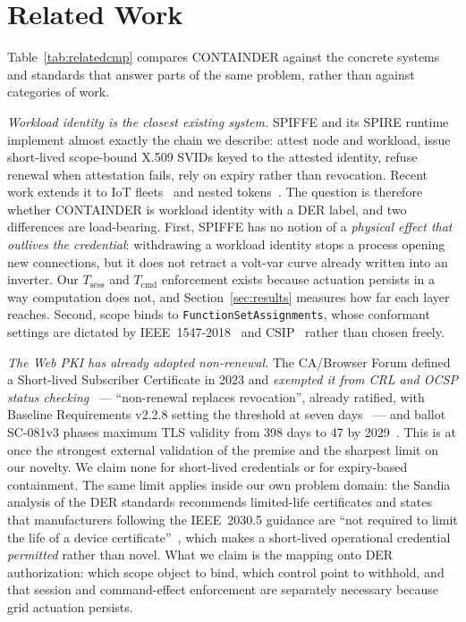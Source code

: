 \section{Related Work}

Table~\ref{tab:relatedcmp} compares CONTAINDER against the concrete systems and standards that
answer parts of the same problem, rather than against categories of work.

\emph{Workload identity is the closest existing system.} SPIFFE and its SPIRE
runtime~\cite{spiffe-spec,spiffe-cncf} implement almost exactly the chain we describe: attest node
and workload, issue short-lived scope-bound X.509 SVIDs keyed to the attested identity, refuse
renewal when attestation fails, rely on expiry rather than revocation. Recent work extends it to
IoT fleets~\cite{bakoyiannis2025spiffe} and nested tokens~\cite{cochak2024lsvid}. The question is
therefore whether CONTAINDER is workload identity with a DER label, and two differences are
load-bearing. First, SPIFFE has no notion of a \emph{physical effect that outlives the
credential}: withdrawing a workload identity stops a process opening new connections, but it does
not retract a volt-var curve already written into an inverter. Our $T_{\mathrm{sess}}$ and
$T_{\mathrm{cmd}}$ enforcement exists because actuation persists in a way computation does not,
and Section~\ref{sec:results} measures how far each layer reaches. Second, scope binds to
\texttt{FunctionSetAssignments}, whose conformant settings are dictated by
IEEE~1547-2018~\cite{ieee1547-2018} and CSIP~\cite{sunspec2018csip} rather than chosen freely.

\emph{The Web PKI has already adopted non-renewal.} The CA/Browser Forum defined a Short-lived
Subscriber Certificate in 2023 and \emph{exempted it from CRL and OCSP status
checking}~\cite{cabf-sc063v4} --- ``non-renewal replaces revocation'', already ratified, with
Baseline Requirements v2.2.8 setting the threshold at seven days~\cite{cabf-br} --- and ballot
SC-081v3 phases maximum TLS validity from 398 days to 47 by 2029~\cite{cabf-sc081v3}. This is at
once the strongest external validation of the premise and the sharpest limit on our novelty. We
claim none for short-lived credentials or for expiry-based containment. The same limit applies
inside our own problem domain: the Sandia analysis of the DER standards recommends limited-life
certificates and states that manufacturers following the IEEE~2030.5 guidance are ``not required
to limit the life of a device certificate''~\cite{obert2019recommendations}, which makes a
short-lived operational credential \emph{permitted} rather than novel. What we claim is the
mapping onto DER authorization: which scope object to bind, which control point to withhold, and
that session and command-effect enforcement are separately necessary because grid actuation
persists.

